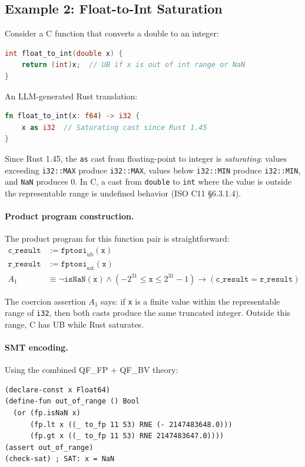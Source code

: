 \documentclass[11pt]{article}
\begin{document}
\subsection{Example 2: Float-to-Int Saturation}
\label{sec:example-float}

Consider a C function that converts a double to an integer:
\begin{lstlisting}[language=C, caption={C source: \texttt{float\_to\_int}}, label={lst:c-ftoi}]
int float_to_int(double x) {
    return (int)x;  // UB if x is out of int range or NaN
}
\end{lstlisting}

An LLM-generated Rust translation:
\begin{lstlisting}[language=Rust, caption={LLM Rust translation: \texttt{float\_to\_int}}, label={lst:rust-ftoi}]
fn float_to_int(x: f64) -> i32 {
    x as i32  // Saturating cast since Rust 1.45
}
\end{lstlisting}

Since Rust 1.45, the \texttt{as} cast from floating-point to integer is \emph{saturating}: values exceeding \texttt{i32::MAX} produce \texttt{i32::MAX}, values below \texttt{i32::MIN} produce \texttt{i32::MIN}, and \texttt{NaN} produces 0.
In C, a cast from \texttt{double} to \texttt{int} where the value is outside the representable range is undefined behavior (ISO C11 \S6.3.1.4).

\paragraph{Product program construction.}
The product program for this function pair is straightforward:
\begin{align*}
  \texttt{c\_result} &:= \texttt{fptosi}_{\mathrm{ub}}(\texttt{x}) \\
  \texttt{r\_result} &:= \texttt{fptosi}_{\mathrm{sat}}(\texttt{x}) \\
  A_1 &\equiv \neg\texttt{isNaN}(\texttt{x}) \wedge (-2^{31} \leq \texttt{x} \leq 2^{31}-1) \to (\texttt{c\_result} = \texttt{r\_result})
\end{align*}

The coercion assertion $A_1$ says: if \texttt{x} is a finite value within the representable range of \texttt{i32}, then both casts produce the same truncated integer. Outside this range, C has UB while Rust saturates.

\paragraph{SMT encoding.}
Using the combined QF\_FP + QF\_BV theory:
\begin{lstlisting}[language=SMT]
(declare-const x Float64)
(define-fun out_of_range () Bool
  (or (fp.isNaN x)
      (fp.lt x ((_ to_fp 11 53) RNE (- 2147483648.0)))
      (fp.gt x ((_ to_fp 11 53) RNE 2147483647.0))))
(assert out_of_range)
(check-sat) ; SAT: x = NaN
\end{lstlisting}
\end{document}
